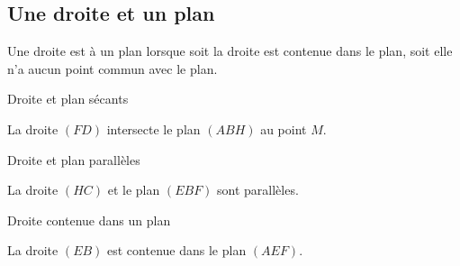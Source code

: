\subsection{Une droite et un plan}

\begin{definition}
    Une droite est  à un plan lorsque soit la droite est contenue dans le plan, soit elle n'a aucun point commun avec le plan.
\end{definition}

\begin{multicols}{2}

    \begin{center}
        Droite et plan sécants
    \end{center}

    La droite \( (FD)\) intersecte le plan \( (ABH)\) au point \( M\).

    \columnbreak
    \begin{center}

    \end{center}
\end{multicols}

\begin{multicols}{2}

    \begin{center}
        Droite et plan parallèles
    \end{center}

    La droite \( (HC)\) et le plan \( (EBF)\) sont parallèles.

    \columnbreak
    \begin{center}

    \end{center}
\end{multicols}

\begin{multicols}{2}

    \begin{center}
        Droite contenue dans un plan
    \end{center}

    La droite \( (EB)\) est contenue dans le plan \( (AEF)\).

    \columnbreak
    \begin{center}

    \end{center}
\end{multicols}


